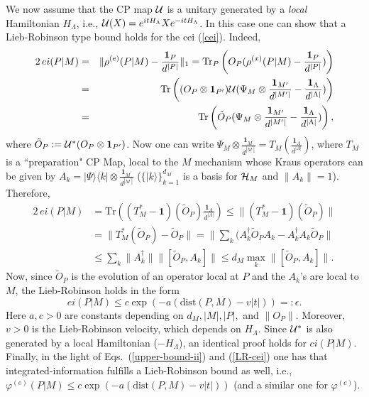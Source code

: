 \documentclass[aps,pra,groupaddress]{revtex4-1}
\begin{document}
We now assume that the CP map ${\cal U}$ is a unitary generated by a
{\em{local}} Hamiltonian $H_\Lambda$, i.e.,
${\cal U}(X)=e^{it H_\Lambda}Xe^{-it H_\Lambda}$. 
In this case one can show that a Lieb-Robinson type bound holds for
the cei (\ref{cei}).
Indeed,
\begin{eqnarray}
2\,ei(P|M)&=&\|\rho^{(e)}(P|M) -\frac{ {\mathbf{1}}_{P} } {d^{|P|}}\|_1={\mathrm{Tr}}_P \left(O_P ( \rho^{(x)}(P|M) -\frac{ {\mathbf{1}}_{P} } {d^{|P|}})\right) \nonumber \\
&=& {\mathrm{Tr}} \left( (O_P\otimes {\mathbf{1}}_{P^\prime}) {\cal U}( \Psi_M \otimes \frac{ {\mathbf{1}}_{M^\prime} } {d^{|M^\prime|}} -\frac{ {\mathbf{1}}_{\Lambda} } {d^{|\Lambda|}})\right) \nonumber \\
&=& {\mathrm{Tr}} \left( \tilde{O}_P (\Psi_M \otimes \frac{ {\mathbf{1}}_{M^\prime} } {d^{|M^\prime|}}-\frac{ {\mathbf{1}}_{\Lambda} } {d^{|\Lambda|}})\right),
\end{eqnarray} 
where $\tilde{O}_P:={\cal U}^*(O_P\otimes {\mathbf{1}}_{P^\prime})$.
Now one can write
$\Psi_M \otimes \frac{ {\mathbf{1}}_{M^\prime} } {d^{|M^\prime|}}=T_M(\frac{ {\mathbf{1}}_{\Lambda} } {d^{|\Lambda|}})$,
where $T_M$ is a ``preparation" CP Map, local to the $M$ mechanism
whose Kraus operators can be given by 
$A_k= |\Psi\rangle \langle k|\otimes \frac{ {\mathbf{1}}_{M^\prime} } {d^{|M^\prime|}}$ 
($\{|k\rangle\}_{k=1}^{d_M}$ is a basis for ${\cal H}_M$ and $\|A_k\|=1$).
Therefore,
\begin{align}
2\,ei(P|M)&={\mathrm{Tr}} \left( (T_M^*-{\mathbf{1}})(\tilde{O}_P)\frac{ {\mathbf{1}}_{\Lambda} } {d^{|\Lambda|}}\right)
\le \|(T_M^*-{\mathbf{1}})(\tilde{O}_P)\| \nonumber \\
&=\|T_M^*(\tilde{O}_P)-\tilde{O}_P\|= \|\sum_k (A_k^\dagger \tilde{O}_P A_k -A_k^\dagger A_k \tilde{O}_P\| \nonumber \\
&\le \sum_k \|A_k^\dagger\|\| [\tilde{O}_P, A_k]\|   
\le d_M \max_k  \| [\tilde{O}_P, A_k]\|.
\end{align}
Now, since $\tilde{O}_P$ is the evolution of an operator local at $P$
and the $A_k$'s are local to $M$, the Lieb-Robinson holds
in the form
\begin{equation}
ei(P|M)\le c \exp\left( -a (\mathrm{dist}(P,M)- v|t|)\right)=:\epsilon.
\label{LR-cei}
\end{equation}
Here $a, c>0$ are constants depending on $d_M, |M|, |P|,$
and $\|O_P\|$.
Moreover, $v>0$ is the Lieb-Robinson velocity, which depends on $H_\Lambda$.
Since ${\cal U}^*$ is also generated by a local Hamiltonian ($-H_\Lambda$),
an identical proof holds for $ci(P|M)$.
Finally, in the light of Eqs.~(\ref{upper-bound-ii}) and
(\ref{LR-cei}) one has that integrated-information fulfills a
Lieb-Robinson bound as well, i.e.,
$\varphi^{(e)}(P|M)\le c \exp\left( -a (\mathrm{dist}(P,M)- v|t|)\right)$ 
(and a similar one for $\varphi^{(c)}$).
\end{document}
